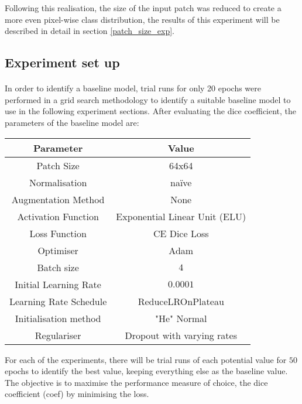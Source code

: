 Following this realisation, the size of the input patch was reduced to create a more even pixel-wise class distribution, the results of this experiment will be described in detail in section \ref{patch_size_exp}.

\subsection{Experiment set up}
\paragraph{}
In order to identify a baseline model, trial runs for only 20 epochs were performed in a grid search methodology to identify a suitable baseline model to use in the following experiment sections. After evaluating the dice coefficient, the parameters of the baseline model are:

\begin{center}
    \begin{tabular}{c|c}     
    \textbf{Parameter} & \textbf{Value}  \\
    \hline
    Patch Size
    &  64x64 \\
    \hline
    Normalisation
    & na\"ive \\
    \hline
    Augmentation Method
    &  None \\
    \hline
    Activation Function
    &  Exponential Linear Unit (ELU) \\
    \hline
    Loss Function
    &  CE Dice Loss\\
    \hline
    Optimiser
    &  Adam \\
    \hline
    Batch size
    &  $4$ \\
    \hline
    Initial Learning Rate
    &  $0.0001$  \\
    \hline
    Learning Rate Schedule
    &  ReduceLROnPlateau  \\
    \hline
    Initialisation method
    &  "He" Normal  \\
    \hline
    Regulariser
    &  Dropout with varying rates \\
    \end{tabular}
\end{center}

For each of the experiments, there will be trial runs of each potential value for $50$ epochs to identify the best value, keeping everything else as the baseline value. The objective is to maximise the performance measure of choice, the dice coefficient (coef) by minimising the loss.
